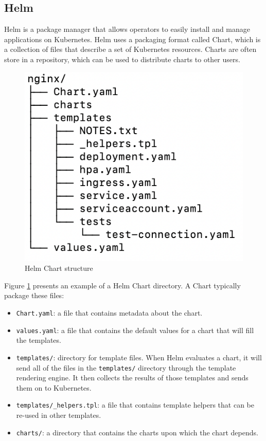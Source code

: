 \documentclass[conference]{IEEEtran}
\begin{document}
\subsection{Helm}

Helm \cite{helm} is a package manager that allows operators to easily install and manage applications on Kubernetes. Helm uses a packaging format called Chart, which is a collection of files that describe a set of Kubernetes resources. Charts are often store in a repository, which can be used to distribute charts to other users.

\begin{figure}
    \centering
    \includegraphics[width=0.5\columnwidth]{chart_struct.png}
    \caption{Helm Chart structure}
    \label{fig:chart_struct}
\end{figure}

Figure \ref{fig:chart_struct} presents an example of a Helm Chart directory. A Chart typically package these files:
\begin{itemize}
    \item \texttt{Chart.yaml}: a file that contains metadata about the chart.
    \item \texttt{values.yaml}: a file that contains the default values for a chart that will fill the templates.
    \item \texttt{templates/}: directory for template files. When Helm evaluates a chart, it will send all of the files in the \texttt{templates/} directory through the template rendering engine. It then collects the results of those templates and sends them on to Kubernetes.
    \item \texttt{templates/\_helpers.tpl}: a file that contains template helpers that can be re-used in other templates.
    \item \texttt{charts/}: a directory that contains the charts upon which the chart depends.
\end{itemize}
\end{document}
